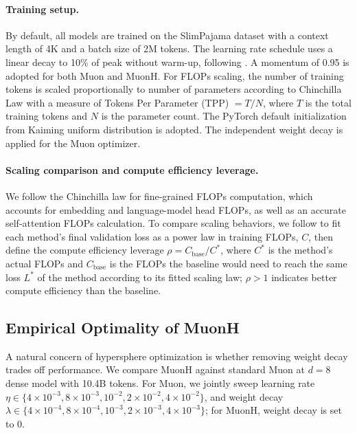 \documentclass{article}
\begin{document}
\paragraph{Training setup.} By default, all models are trained on the SlimPajama dataset \cite{slimpajama} with a context length of 4K and a batch size of 2M tokens. The learning rate schedule uses a linear decay to 10\% of peak without warm-up, following \cite{modded_nanogpt_2024}. A momentum of 0.95 is adopted for both Muon and MuonH. For FLOPs scaling, the number of training tokens is scaled proportionally to number of parameters according to Chinchilla Law \cite{chinchilla} with a measure of Tokens Per Parameter (TPP) $= T / N$, where $T$ is the total training tokens and $N$ is the parameter count.  The PyTorch \cite{paszke2019pytorch} default initialization from Kaiming uniform distribution \cite{resnet} is adopted. The independent weight decay \cite{wortsman2024smallscale} is applied for the Muon optimizer.



\paragraph{Scaling comparison and compute efficiency leverage.}
We follow the Chinchilla law \cite{chinchilla} for fine-grained FLOPs computation, which accounts for embedding and language-model head FLOPs, as well as an accurate self-attention FLOPs calculation.
To compare scaling behaviors, we follow \cite{kaplan2020scaling, team2025every} to fit each method's final validation loss as a power law in training FLOPs, $C$, then define the compute efficiency leverage $\rho = C_{\mathrm{base}} / C^{*}$, where $C^{*}$ is the method's actual FLOPs and $C_{\mathrm{base}}$ is the FLOPs the baseline would need to reach the same loss $L^{*}$ of the method according to its fitted scaling law; $\rho > 1$ indicates better compute efficiency than the baseline.



\subsection{Empirical Optimality of MuonH}\label{sec:optimality}

A natural concern of hypersphere optimization is whether removing weight decay trades off performance. We compare MuonH against standard Muon at $d{=}8$ dense model with 10.4B tokens. For Muon, we jointly sweep learning rate $\eta \in \{4{\times}10^{-3}, 8{\times}10^{-3}, 10^{-2}, 2{\times}10^{-2}, 4{\times}10^{-2}\}$, and weight decay $\lambda \in \{4{\times}10^{-4}, 8{\times}10^{-4}, 10^{-3}, 2{\times}10^{-3}, 4{\times}10^{-3}\}$; for MuonH, weight decay is set to 0.
\end{document}
